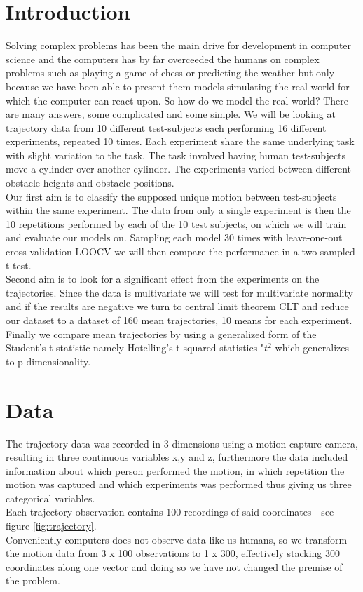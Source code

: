 \documentclass{article}
\begin{document}
\section{Introduction}
Solving complex problems has been the main drive for development in computer science and the computers has by far overceeded the humans on complex problems such as playing a game of chess or predicting the weather but only because we have been able to present them models simulating the real world for which the computer can react upon. So how do we model the real world? There are many answers, some complicated and some simple. We will be looking at trajectory data from 10 different test-subjects each performing 16 different experiments, repeated 10 times. Each experiment share the same underlying task with slight variation to the task. The task involved having human test-subjects move a cylinder over another cylinder. The experiments varied between different obstacle heights and obstacle positions. \\ Our first aim is to classify the supposed unique motion between test-subjects within the same experiment. The data from only a single experiment is then the 10 repetitions performed by each of the 10 test subjects, on which we will train and evaluate our models on. Sampling each model 30 times with leave-one-out cross validation LOOCV we will then compare the performance in a two-sampled t-test. \\Second aim is to look for a significant effect from the experiments on the trajectories. Since the data is multivariate we will test for multivariate normality and if the results are negative we turn to central limit theorem CLT and reduce our dataset to a dataset of 160 mean trajectories, 10 means for each experiment. Finally we compare mean trajectories by using a generalized form of the Student's t-statistic namely Hotelling's t-squared statistics "$t^{2}$ which generalizes to p-dimensionality.


\section{Data}
The trajectory data was recorded in 3 dimensions using a motion capture camera, resulting in three continuous variables x,y and z, furthermore the data included information about which person performed the motion, in which repetition the motion was captured and which experiments was performed thus giving us three categorical variables. \\ Each trajectory observation contains 100 recordings of said coordinates - see figure \ref{fig:trajectory}. \\Conveniently computers does not observe data like us humans, so we transform the motion data from 3 x 100 observations to 1 x 300, effectively stacking 300 coordinates along one vector and doing so we have not changed the premise of the problem.
\end{document}
